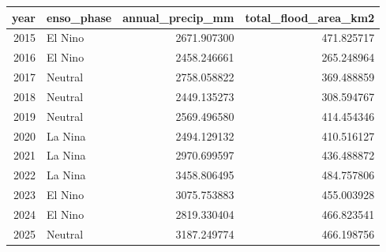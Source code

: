 \begin{tabular}{rlrr}
\toprule
year & enso\_phase & annual\_precip\_mm & total\_flood\_area\_km2 \\
\midrule
2015 & El Nino & 2671.907300 & 471.825717 \\
2016 & El Nino & 2458.246661 & 265.248964 \\
2017 & Neutral & 2758.058822 & 369.488859 \\
2018 & Neutral & 2449.135273 & 308.594767 \\
2019 & Neutral & 2569.496580 & 414.454346 \\
2020 & La Nina & 2494.129132 & 410.516127 \\
2021 & La Nina & 2970.699597 & 436.488872 \\
2022 & La Nina & 3458.806495 & 484.757806 \\
2023 & El Nino & 3075.753883 & 455.003928 \\
2024 & El Nino & 2819.330404 & 466.823541 \\
2025 & Neutral & 3187.249774 & 466.198756 \\
\bottomrule
\end{tabular}
